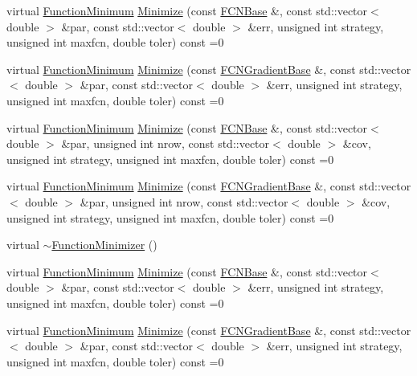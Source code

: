 \begin{DoxyCompactItemize}
virtual \mbox{\hyperlink{classROOT_1_1Minuit2_1_1FunctionMinimum}{Function\+Minimum}} \mbox{\hyperlink{classROOT_1_1Minuit2_1_1FunctionMinimizer_aa664d755554be28f42be8270b8c35139}{Minimize}} (const \mbox{\hyperlink{classROOT_1_1Minuit2_1_1FCNBase}{F\+C\+N\+Base}} \&, const std\+::vector$<$ double $>$ \&par, const std\+::vector$<$ double $>$ \&err, unsigned int strategy, unsigned int maxfcn, double toler) const =0
\item 
virtual \mbox{\hyperlink{classROOT_1_1Minuit2_1_1FunctionMinimum}{Function\+Minimum}} \mbox{\hyperlink{classROOT_1_1Minuit2_1_1FunctionMinimizer_ac6063af1cb58f0fd75b16d3cebc49f54}{Minimize}} (const \mbox{\hyperlink{classROOT_1_1Minuit2_1_1FCNGradientBase}{F\+C\+N\+Gradient\+Base}} \&, const std\+::vector$<$ double $>$ \&par, const std\+::vector$<$ double $>$ \&err, unsigned int strategy, unsigned int maxfcn, double toler) const =0
\item 
virtual \mbox{\hyperlink{classROOT_1_1Minuit2_1_1FunctionMinimum}{Function\+Minimum}} \mbox{\hyperlink{classROOT_1_1Minuit2_1_1FunctionMinimizer_a22d44dc8c018424a98ce8928ee7c5613}{Minimize}} (const \mbox{\hyperlink{classROOT_1_1Minuit2_1_1FCNBase}{F\+C\+N\+Base}} \&, const std\+::vector$<$ double $>$ \&par, unsigned int nrow, const std\+::vector$<$ double $>$ \&cov, unsigned int strategy, unsigned int maxfcn, double toler) const =0
\item 
virtual \mbox{\hyperlink{classROOT_1_1Minuit2_1_1FunctionMinimum}{Function\+Minimum}} \mbox{\hyperlink{classROOT_1_1Minuit2_1_1FunctionMinimizer_a467a9dd60665c9b31969fe55d73b6401}{Minimize}} (const \mbox{\hyperlink{classROOT_1_1Minuit2_1_1FCNGradientBase}{F\+C\+N\+Gradient\+Base}} \&, const std\+::vector$<$ double $>$ \&par, unsigned int nrow, const std\+::vector$<$ double $>$ \&cov, unsigned int strategy, unsigned int maxfcn, double toler) const =0
\item 
virtual \mbox{\hyperlink{classROOT_1_1Minuit2_1_1FunctionMinimizer_a804a5a18f04fce8e2fcbb37d2a1b714d}{$\sim$\+Function\+Minimizer}} ()
\item 
virtual \mbox{\hyperlink{classROOT_1_1Minuit2_1_1FunctionMinimum}{Function\+Minimum}} \mbox{\hyperlink{classROOT_1_1Minuit2_1_1FunctionMinimizer_aa664d755554be28f42be8270b8c35139}{Minimize}} (const \mbox{\hyperlink{classROOT_1_1Minuit2_1_1FCNBase}{F\+C\+N\+Base}} \&, const std\+::vector$<$ double $>$ \&par, const std\+::vector$<$ double $>$ \&err, unsigned int strategy, unsigned int maxfcn, double toler) const =0
\item 
virtual \mbox{\hyperlink{classROOT_1_1Minuit2_1_1FunctionMinimum}{Function\+Minimum}} \mbox{\hyperlink{classROOT_1_1Minuit2_1_1FunctionMinimizer_ac6063af1cb58f0fd75b16d3cebc49f54}{Minimize}} (const \mbox{\hyperlink{classROOT_1_1Minuit2_1_1FCNGradientBase}{F\+C\+N\+Gradient\+Base}} \&, const std\+::vector$<$ double $>$ \&par, const std\+::vector$<$ double $>$ \&err, unsigned int strategy, unsigned int maxfcn, double toler) const =0

\end{DoxyCompactItemize}
